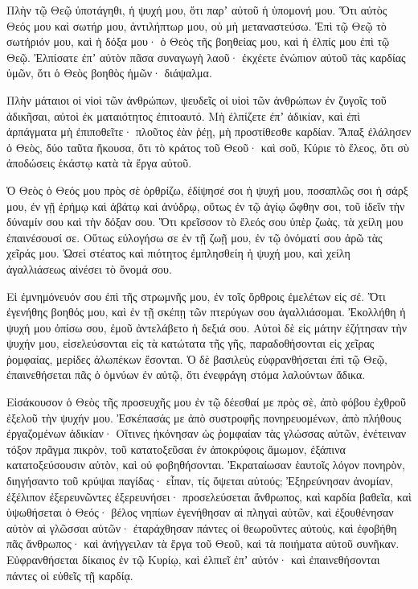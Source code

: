\begin{spacing}{1.1}
\begin{multicols}{2}
Πλὴν τῷ Θεῷ ὑποτάγηθι, ἡ ψυχή μου, ὅτι παρʼ αὐτοῦ ἡ ὑπομονή μου.
Ὅτι αὐτὸς Θεός μου καὶ σωτήρ μου, ἀντιλήπτωρ μου, οὐ μὴ μεταναστεύσω.
Ἐπὶ τῷ Θεῷ τὸ σωτήριόν μου, καὶ ἡ δόξα μου· ὁ Θεὸς τῆς βοηθείας μου, καὶ ἡ ἐλπίς μου ἐπὶ τῷ Θεῷ.
Ἐλπίσατε ἐπʼ αὐτὸν πᾶσα συναγωγὴ λαοῦ· ἐκχέετε ἐνώπιον αὐτοῦ τὰς καρδίας ὑμῶν, ὅτι ὁ Θεὸς βοηθὸς ἡμῶν· διάψαλμα.

Πλὴν μάταιοι οἱ νἱοὶ τῶν ἀνθρώπων, ψευδεῖς οἱ υἱοὶ τῶν ἀνθρώπων ἐν ζυγοῖς τοῦ ἀδικῆσαι, αὐτοὶ ἐκ ματαιότητος ἐπιτοαυτό.
Μὴ ἐλπίζετε ἐπʼ ἀδικίαν, καὶ ἐπὶ ἁρπάγματα μὴ ἐπιποθεῖτε· πλοῦτος ἐὰν ῥέῃ, μὴ προστίθεσθε καρδίαν.
Ἅπαξ ἐλάλησεν ὁ Θεὸς, δύο ταῦτα ἤκουσα, ὅτι τὸ κράτος τοῦ Θεοῦ·
καὶ σοῦ, Κύριε τὸ ἔλεος, ὅτι σὺ ἀποδώσεις ἑκάστῳ κατὰ τὰ ἔργα αὐτοῦ.

Ὁ Θεὸς ὁ Θεός μου πρὸς σὲ ὀρθρίζω, ἐδίψησέ σοι ἡ ψυχή μου, ποσαπλῶς σοι ἡ σάρξ μου, ἐν γῇ ἐρήμῳ καὶ ἀβάτῳ καὶ ἀνύδρῳ,
οὕτως ἐν τῷ ἁγίῳ ὤφθην σοι, τοῦ ἰδεῖν τὴν δύναμίν σου καὶ τὴν δόξαν σου.
Ὅτι κρεῖσσον τὸ ἔλεός σου ὑπὲρ ζωὰς, τὰ χείλη μου ἐπαινέσουσί σε.
Οὕτως εὐλογήσω σε ἐν τῇ ζωῇ μου, ἐν τῷ ὀνόματί σου ἀρῶ τὰς χεῖράς μου.
Ὡσεὶ στέατος καὶ πιότητος ἐμπλησθείη ἡ ψυχή μου, καὶ χείλη ἀγαλλιάσεως αἰνέσει τὸ ὄνομά σου.

Εἰ ἐμνημόνευόν σου ἐπὶ τῆς στρωμνῆς μου, ἐν τοῖς ὄρθροις ἐμελέτων εἰς σέ.
Ὅτι ἐγενήθης βοηθός μου, καὶ ἐν τῇ σκέπῃ τῶν πτερύγων σου ἀγαλλιάσομαι.
Ἐκολλήθη ἡ ψυχή μου ὀπίσω σου, ἐμοῦ ἀντελάβετο ἡ δεξιά σου.
Αὐτοὶ δὲ εἰς μάτην ἐζήτησαν τὴν ψυχήν μου, εἰσελεύσονται εἰς τὰ κατώτατα τῆς γῆς,
παραδοθήσονται εἰς χεῖρας ῥομφαίας, μερίδες ἀλωπέκων ἔσονται.
Ὁ δὲ βασιλεὺς εὐφρανθήσεται ἐπὶ τῷ Θεῷ, ἐπαινεθήσεται πᾶς ὁ ὀμνύων ἐν αὐτῷ, ὅτι ἐνεφράγη στόμα λαλούντων ἄδικα.

Εἰσάκουσον ὁ Θεὸς τῆς προσευχῆς μου ἐν τῷ δέεσθαί με πρὸς σὲ, ἀπὸ φόβου ἐχθροῦ ἐξελοῦ τὴν ψυχήν μου.
Ἐσκέπασάς με ἀπὸ συστροφῆς πονηρευομένων, ἀπὸ πλήθους ἐργαζομένων ἀδικίαν·
Οἵτινες ἠκόνησαν ὡς ῥομφαίαν τὰς γλώσσας αὐτῶν, ἐνέτειναν τόξον πρᾶγμα πικρὸν,
τοῦ κατατοξεῦσαι ἐν ἀποκρύφοις ἄμωμον, ἐξάπινα κατατοξεύσουσιν αὐτὸν, καὶ οὐ φοβηθήσονται.
Ἐκραταίωσαν ἑαυτοῖς λόγον πονηρὸν, διηγήσαντο τοῦ κρύψαι παγίδας· εἶπαν, τίς ὄψεται αὐτούς;
Ἐξηρεύνησαν ἀνομίαν, ἐξέλιπον ἐξερευνῶντες ἐξερευνήσει· προσελεύσεται ἄνθρωπος, καὶ καρδία βαθεῖα,
καὶ ὑψωθήσεται ὁ Θεός· βέλος νηπίων ἐγενήθησαν αἱ πληγαὶ αὐτῶν,
καὶ ἐξουθένησαν αὐτὸν αἱ γλῶσσαι αὐτῶν· ἐταράχθησαν πάντες οἱ θεωροῦντες αὐτοὺς,
καὶ ἐφοβήθη πᾶς ἄνθρωπος· καὶ ἀνήγγειλαν τὰ ἔργα τοῦ Θεοῦ, καὶ τὰ ποιήματα αὐτοῦ συνῆκαν.
Εὐφρανθήσεται δίκαιος ἐν τῷ Κυρίῳ, καὶ ἐλπιεῖ ἐπʼ αὐτόν· καὶ ἐπαινεθήσονται πάντες οἱ εὐθεῖς τῇ καρδίᾳ.


\end{multicols}
\end{spacing}
